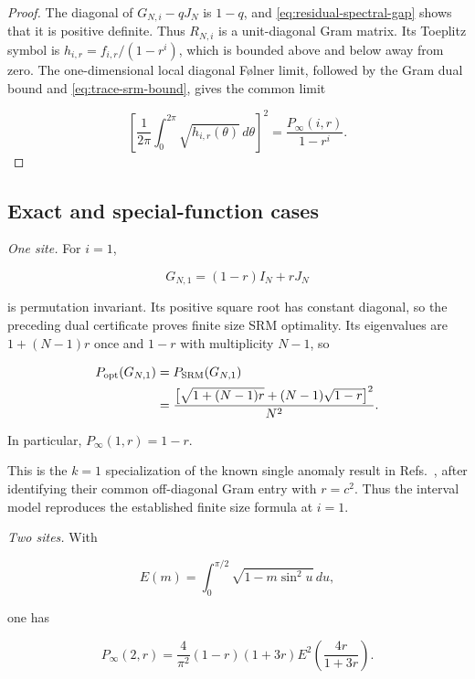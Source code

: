 \begin{proof}
The diagonal of \(G_{N,i}-qJ_N\) is \(1-q\), and
\eqref{eq:residual-spectral-gap} shows that it is positive definite. Thus
\(R_{N,i}\) is a unit-diagonal Gram matrix. Its Toeplitz symbol is
\(h_{i,r}=f_{i,r}/(1-r^i)\), which is bounded above and below away from zero.
The one-dimensional local diagonal Følner limit, followed by the Gram dual
bound and \eqref{eq:trace-srm-bound}, gives the common
limit

\[
\left[\frac1{2\pi}\int_0^{2\pi}\sqrt{h_{i,r}(\theta)}\,d\theta\right]^2
=\frac{P_\infty(i,r)}{1-r^i}.
\]
\end{proof}

\subsection{Exact and special-function cases}\label{exact-and-special-function-cases}

\begin{corollary}
\label{cor:short-intervals}
\emph{One site.}
For \(i=1\),

\[
G_{N,1}=(1-r)I_N+rJ_N
\]

is permutation invariant. Its positive square root has constant diagonal, so
the preceding dual certificate proves finite size SRM optimality. Its
eigenvalues are \(1+(N-1)r\) once and \(1-r\) with multiplicity \(N-1\), so

\begin{align}\label{eq:one-site-finite}
P_{\rm opt}(G_{N,1})
&=P_{\rm SRM}(G_{N,1}) \notag\\
&=\frac{\bigl[\sqrt{1+(N-1)r}
+(N-1)\sqrt{1-r}\bigr]^2}{N^2}.
\end{align}

In particular, \(P_\infty(1,r)=1-r\).

This is the \(k=1\) specialization of the known single anomaly result in
Refs.~\cite{skotiniotis2024,llorens2024}, after identifying their common
off-diagonal Gram entry with \(r=c^2\). Thus the interval model reproduces the
established finite size formula at \(i=1\).

\par\medskip\noindent\emph{Two sites.}
With

\[
E(m)=\int_0^{\pi/2}\sqrt{1-m\sin^2u}\,du,
\]

one has

\begin{equation}\label{eq:two-site-elliptic}
P_\infty(2,r)
=\frac4{\pi^2}(1-r)(1+3r)
E^2\!\left(\frac{4r}{1+3r}\right).
\end{equation}
\end{corollary}

